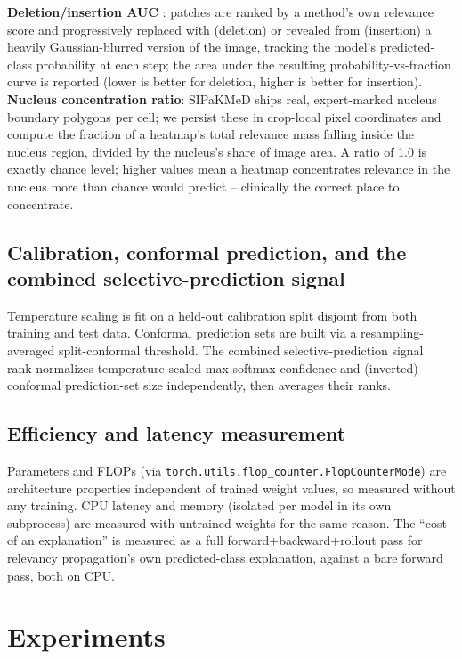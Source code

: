 \documentclass[runningheads]{llncs}
\begin{document}
\textbf{Deletion/insertion AUC} \cite{petsiuk2018rise}: patches are ranked
by a method's own relevance score and progressively replaced with
(deletion) or revealed from (insertion) a heavily Gaussian-blurred version
of the image, tracking the model's predicted-class probability at each
step; the area under the resulting probability-vs-fraction curve is
reported (lower is better for deletion, higher is better for insertion).
\textbf{Nucleus concentration ratio}: SIPaKMeD ships real, expert-marked
nucleus boundary polygons per cell; we persist these in crop-local pixel
coordinates and compute the fraction of a heatmap's total relevance mass
falling inside the nucleus region, divided by the nucleus's share of
image area. A ratio of 1.0 is exactly chance level; higher values mean a
heatmap concentrates relevance in the nucleus more than chance would
predict -- clinically the correct place to concentrate.

\subsection{Calibration, conformal prediction, and the combined selective-prediction signal}

Temperature scaling \cite{guo2017calibration} is fit on a held-out
calibration split disjoint from both training and test data. Conformal
prediction sets are built via a resampling-averaged split-conformal
threshold. The combined selective-prediction signal rank-normalizes
temperature-scaled max-softmax confidence and (inverted) conformal
prediction-set size independently, then averages their ranks.

\subsection{Efficiency and latency measurement}

Parameters and FLOPs (via \texttt{torch.utils.flop\_counter.FlopCounterMode})
are architecture properties independent of trained weight values, so
measured without any training. CPU latency and memory (isolated per model
in its own subprocess) are measured with untrained weights for the same
reason. The ``cost of an explanation'' is measured as a full
forward+backward+rollout pass for relevancy propagation's own
predicted-class explanation, against a bare forward pass, both on CPU.

\section{Experiments}
\end{document}
